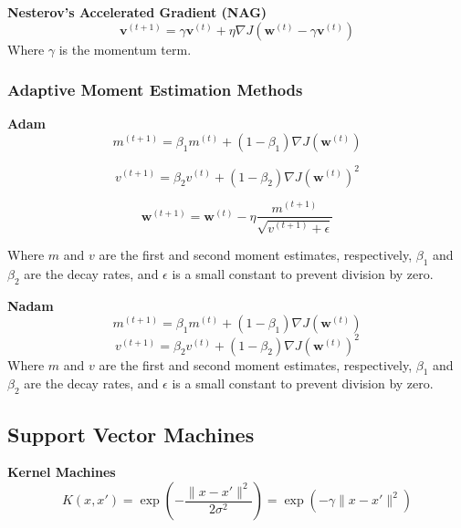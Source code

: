 \documentclass[8pt]{article}
\begin{document}
\begin{multicols}{2}
\textbf{Nesterov's Accelerated Gradient (NAG)}
\begin{equation}
    \mathbf{v}^{(t+1)} = \gamma \mathbf{v}^{(t)} + \eta \nabla J(\mathbf{w}^{(t)} - \gamma \mathbf{v}^{(t)})
\end{equation}
Where $\gamma$ is the momentum term.

\subsubsection*{Adaptive Moment Estimation Methods}

\textbf{Adam}
\begin{equation}
    m^{(t+1)} = \beta_1 m^{(t)} + (1 - \beta_1) \nabla J(\mathbf{w}^{(t)})
\end{equation}

\begin{equation}
    v^{(t+1)} = \beta_2 v^{(t)} + (1 - \beta_2) \nabla J(\mathbf{w}^{(t)})^2
\end{equation}

\begin{equation}
    \mathbf{w}^{(t+1)} = \mathbf{w}^{(t)} - \eta \frac{m^{(t+1)}}{\sqrt{v^{(t+1)} + \epsilon}}
\end{equation}

Where $m$ and $v$ are the first and second moment estimates, respectively, $\beta_1$ and $\beta_2$ are the decay rates, and $\epsilon$ is a small constant to prevent division by zero.

\textbf{Nadam}
\begin{equation}
    m^{(t+1)} = \beta_1 m^{(t)} + (1 - \beta_1) \nabla J(\mathbf{w}^{(t)})
\end{equation}
\begin{equation}
    v^{(t+1)} = \beta_2 v^{(t)} + (1 - \beta_2) \nabla J(\mathbf{w}^{(t)})^2
\end{equation}
Where $m$ and $v$ are the first and second moment estimates, respectively, $\beta_1$ and $\beta_2$ are the decay rates, and $\epsilon$ is a small constant to prevent division by zero.


\subsection*{Support Vector Machines}
\textbf{Kernel Machines}
\begin{equation}
    K(x, x') = \exp(-\frac{\|x - x'\|^2}{2\sigma^2}) = \exp(-\gamma \|x - x'\|^2)
\end{equation}


\end{multicols}
\end{document}
